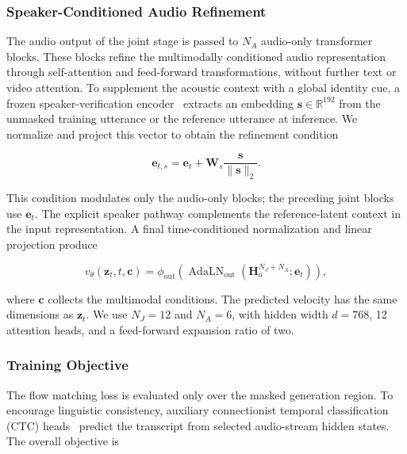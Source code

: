 \subsubsection{Speaker-Conditioned Audio Refinement}

The audio output of the joint stage is passed to \(N_A\) audio-only transformer blocks. These blocks refine the multimodally conditioned audio representation through self-attention and feed-forward transformations, without further text or video attention. To supplement the acoustic context with a global identity cue, a frozen speaker-verification encoder~\cite{wang2023campplus} extracts an embedding \(\mathbf{s}\in\mathbb{R}^{192}\) from the unmasked training utterance or the reference utterance at inference. We normalize and project this vector to obtain the refinement condition

\begin{equation}
\mathbf{e}_{t,s}
=
\mathbf{e}_t
+
\mathbf{W}_s
\frac{\mathbf{s}}{\|\mathbf{s}\|_2}.
\label{eq:speaker_condition}
\end{equation}

This condition modulates only the audio-only blocks; the preceding joint blocks use \(\mathbf{e}_t\). The explicit speaker pathway complements the reference-latent context in the input representation. A final time-conditioned normalization and linear projection produce

\begin{equation}
v_\theta(\mathbf{z}_t,t,\mathbf{c})
=
\phi_{\mathrm{out}}
\left(
\operatorname{AdaLN}_{\mathrm{out}}
(\mathbf{H}_a^{N_J+N_A};\mathbf{e}_t)
\right),
\label{eq:velocity_output}
\end{equation}

where \(\mathbf{c}\) collects the multimodal conditions. The predicted velocity has the same dimensions as \(\mathbf{z}_t\). We use \(N_J=12\) and \(N_A=6\), with hidden width \(d=768\), 12 attention heads, and a feed-forward expansion ratio of two.

\subsubsection{Training Objective}

The flow matching loss is evaluated only over the masked generation region. To encourage linguistic consistency, auxiliary connectionist temporal classification (CTC) heads~\cite{choi2025aligndit,graves2006ctc} predict the transcript from selected audio-stream hidden states. The overall objective is

